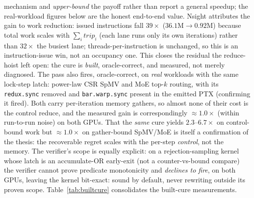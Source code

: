 \documentclass[sigplan,10pt]{acmart}
\begin{document}
mechanism and \emph{upper-bound} the payoff rather than report a general speedup; the real-workload
figures below are the honest end-to-end value. Nsight attributes the gain to work reduction: issued instructions fall \textbf{$39\times$}
($36.1\mathrm{M}\rightarrow0.92\mathrm{M}$) because total work scales with $\sum_i \mathit{trip}_i$ (each
lane runs only its own iterations) rather than $32\times$ the busiest lane; threads-per-instruction is
unchanged, so this is an instruction-issue win, not an occupancy one. This closes the residual the
reduce-hoist left open: the cure is \emph{built}, oracle-correct, and measured, not merely diagnosed. The pass also fires, oracle-correct, on \emph{real} workloads with the same lock-step
latch: power-law CSR SpMV and MoE top-$k$ routing, with its \texttt{redux.sync} removed and
\texttt{bar.warp.sync} present in the emitted PTX (confirming it fired). Both carry per-iteration
memory gathers, so almost none of their cost is the control reduce, and the measured gain is
correspondingly ${\approx}1.0\times$ (within run-to-run noise) on both GPUs. That the \emph{same} cure
yields $2.3$--$6.7\times$ on control-bound work but ${\approx}1.0\times$ on gather-bound SpMV/MoE is
itself a confirmation of the thesis: the recoverable regret scales with the per-step \emph{control}, not
the memory. The verifier's scope is equally explicit: on a rejection-sampling kernel whose latch is an
accumulate-OR early-exit (not a counter-vs-bound compare) the verifier cannot prove predicate
monotonicity and \emph{declines to fire}, on both GPUs, leaving the kernel bit-exact: sound by default,
never rewriting outside its proven scope.
Table~\ref{tab:builtcure} consolidates the built-cure measurements.
\end{document}
